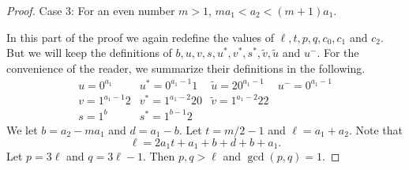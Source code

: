 \documentclass[10pt,a4paper]{amsart}
\begin{document}
\begin{proof}
   
Case 3: For an even number $m>1$, $ma_1<a_2<(m+1)a_1$. 

In this part of the proof we again redefine the values of $\ell, t, p, q, c_0, c_1$ and $c_2$. But we will keep the definitions of $b, u, v, s, u^*, v^*, s^*, \tilde{v}, \tilde{u}$ and $u^{-}$. For the convenience of the reader, we summarize their definitions in the following.
$$\begin{array}{llll}
u=0^{a_1} & u^*=0^{a_1-1}1 & \tilde{u}=20^{a_1-1} & u^-=0^{a_1-1}\\
v=1^{a_1-1}2 & v^*=1^{a_1-2}20 & \tilde{v}=1^{a_1-2}22 & \\
s=1^b & s^*=1^{b-1}2 & & 
\end{array}
$$
We let $b=a_2-ma_1$ and $d=a_1-b$. Let $t=m/2-1$ and $\ell=a_1+a_2$. Note that
$$\ell=2a_1t+a_1+b+d+b+a_1.$$
Let $p=3\ell$ and $q=3\ell-1$. Then $p, q>\ell$ and $\gcd(p,q)=1$. 


\end{proof}
\end{document}
